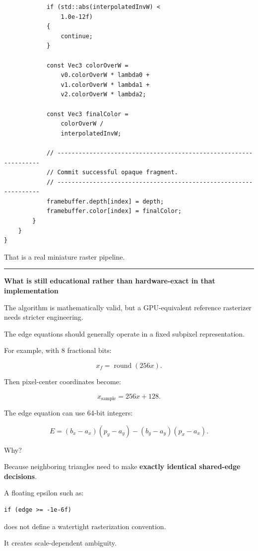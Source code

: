 \begin{verbatim}
            if (std::abs(interpolatedInvW) <
                1.0e-12f)
            {
                continue;
            }

            const Vec3 colorOverW =
                v0.colorOverW * lambda0 +
                v1.colorOverW * lambda1 +
                v2.colorOverW * lambda2;

            const Vec3 finalColor =
                colorOverW /
                interpolatedInvW;

            // -----------------------------------------------------------------
            // Commit successful opaque fragment.
            // -----------------------------------------------------------------
            framebuffer.depth[index] = depth;
            framebuffer.color[index] = finalColor;
        }
    }
}
\end{verbatim}

That is a real miniature raster pipeline.

\begin{center}\rule{0.5\linewidth}{0.5pt}\end{center}

\textbf{What is still educational rather than hardware-exact in that implementation}

The algorithm is mathematically valid, but a GPU-equivalent reference rasterizer needs stricter engineering.

The edge equations should generally operate in a fixed subpixel representation.

For example, with 8 fractional bits:

\[
x_f=\operatorname{round}(256x).
\]

Then pixel-center coordinates become:

\[
x_{\text{sample}}
=
256x+128.
\]

The edge equation can use 64-bit integers:

\[
E=
(b_x-a_x)(p_y-a_y)
-
(b_y-a_y)(p_x-a_x).
\]

Why?

Because neighboring triangles need to make \textbf{exactly identical shared-edge decisions}.

A floating epsilon such as:

\begin{verbatim}
if (edge >= -1e-6f)
\end{verbatim}

does not define a watertight rasterization convention.

It creates scale-dependent ambiguity.

